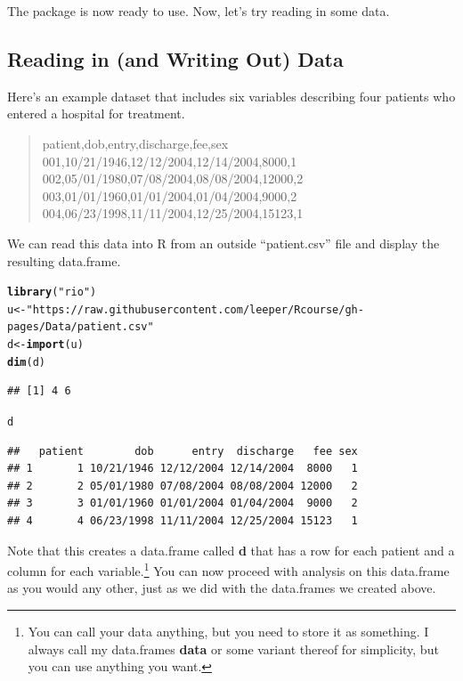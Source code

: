 \documentclass[12pt]{article}\usepackage[]{graphicx}\usepackage[]{color}
\makeatletter
\newcommand{\hlstr}[1]{\textcolor[rgb]{0.192,0.494,0.8}{#1}}%
\newcommand{\hlstd}[1]{\textcolor[rgb]{0.345,0.345,0.345}{#1}}%
\newcommand{\hlkwb}[1]{\textcolor[rgb]{0.69,0.353,0.396}{#1}}%
\newcommand{\hlkwd}[1]{\textcolor[rgb]{0.737,0.353,0.396}{\textbf{#1}}}%
\newenvironment{kframe}{%
 \def\at@end@of@kframe{}%
 \ifinner\ifhmode%
  \def\at@end@of@kframe{\end{minipage}}%
  \begin{minipage}{\columnwidth}%
 \fi\fi%
 \def\FrameCommand##1{\hskip\@totalleftmargin \hskip-\fboxsep
 \colorbox{shadecolor}{##1}\hskip-\fboxsep
     \hskip-\linewidth \hskip-\@totalleftmargin \hskip\columnwidth}%
 \MakeFramed {\advance\hsize-\width
   \@totalleftmargin\z@ \linewidth\hsize
   \@setminipage}}%
 {\par\unskip\endMakeFramed%
 \at@end@of@kframe}
\newenvironment{knitrout}{}{} %
\makeatother
\begin{document}
The package is now ready to use. Now, let's try reading in some data.

\subsection{Reading in (and Writing Out) Data}
Here's an example dataset that includes six variables describing four patients who entered a hospital for treatment.

\begin{quote}
patient,dob,entry,discharge,fee,sex\\
001,10/21/1946,12/12/2004,12/14/2004,8000,1\\
002,05/01/1980,07/08/2004,08/08/2004,12000,2\\
003,01/01/1960,01/01/2004,01/04/2004,9000,2\\
004,06/23/1998,11/11/2004,12/25/2004,15123,1\\
\end{quote}

We can read this data into R from an outside ``patient.csv'' file and display the resulting data.frame.

\begin{knitrout}
\color{fgcolor}\begin{kframe}
\begin{alltt}
\hlkwd{library}\hlstd{(}\hlstr{"rio"}\hlstd{)}
\hlstd{u} \hlkwb{<-} \hlstr{"https://raw.githubusercontent.com/leeper/Rcourse/gh-pages/Data/patient.csv"}
\hlstd{d}  \hlkwb{<-}  \hlkwd{import}\hlstd{(u)}
\hlkwd{dim}\hlstd{(d)}
\end{alltt}
\begin{verbatim}
## [1] 4 6
\end{verbatim}
\begin{alltt}
\hlstd{d}
\end{alltt}
\begin{verbatim}
##   patient        dob      entry  discharge   fee sex
## 1       1 10/21/1946 12/12/2004 12/14/2004  8000   1
## 2       2 05/01/1980 07/08/2004 08/08/2004 12000   2
## 3       3 01/01/1960 01/01/2004 01/04/2004  9000   2
## 4       4 06/23/1998 11/11/2004 12/25/2004 15123   1
\end{verbatim}
\end{kframe}
\end{knitrout}

Note that this creates a data.frame called \textbf{d} that has a row for each patient and a column for each variable.\footnote{You can call your data anything, but you need to store it as something. I always call my data.frames \textbf{data} or some variant thereof for simplicity, but you can use anything you want.} You can now proceed with analysis on this data.frame as you would any other, just as we did with the data.frames we created above.
\end{document}
